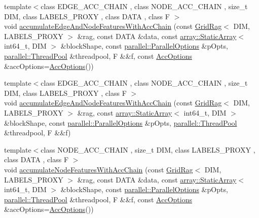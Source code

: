 \begin{DoxyCompactItemize}
\item 
{\footnotesize template$<$class E\+D\+G\+E\+\_\+\+A\+C\+C\+\_\+\+C\+H\+A\+I\+N , class N\+O\+D\+E\+\_\+\+A\+C\+C\+\_\+\+C\+H\+A\+I\+N , size\+\_\+t D\+I\+M, class L\+A\+B\+E\+L\+S\+\_\+\+P\+R\+O\+X\+Y , class D\+A\+T\+A , class F $>$ }\\void \hyperlink{namespacenifty_1_1graph_a8f3282d2d63b3f644bf2176ed21d3082}{accumulate\+Edge\+And\+Node\+Features\+With\+Acc\+Chain} (const \hyperlink{classnifty_1_1graph_1_1GridRag}{Grid\+Rag}$<$ D\+I\+M, L\+A\+B\+E\+L\+S\+\_\+\+P\+R\+O\+X\+Y $>$ \&rag, const D\+A\+T\+A \&data, const \hyperlink{namespacenifty_1_1array_a683f151f19c851754e0c6d55ed16a0c2}{array\+::\+Static\+Array}$<$ int64\+\_\+t, D\+I\+M $>$ \&block\+Shape, const \hyperlink{classnifty_1_1parallel_1_1ParallelOptions}{parallel\+::\+Parallel\+Options} \&p\+Opts, \hyperlink{classnifty_1_1parallel_1_1ThreadPool}{parallel\+::\+Thread\+Pool} \&threadpool, F \&\&f, const \hyperlink{structnifty_1_1graph_1_1AccOptions}{Acc\+Options} \&acc\+Options=\hyperlink{structnifty_1_1graph_1_1AccOptions}{Acc\+Options}())
\item 
{\footnotesize template$<$class E\+D\+G\+E\+\_\+\+A\+C\+C\+\_\+\+C\+H\+A\+I\+N , class N\+O\+D\+E\+\_\+\+A\+C\+C\+\_\+\+C\+H\+A\+I\+N , size\+\_\+t D\+I\+M, class L\+A\+B\+E\+L\+S\+\_\+\+P\+R\+O\+X\+Y , class F $>$ }\\void \hyperlink{namespacenifty_1_1graph_a5e388756ae7e421f92ef5f78494b94d7}{accumulate\+Edge\+And\+Node\+Features\+With\+Acc\+Chain} (const \hyperlink{classnifty_1_1graph_1_1GridRag}{Grid\+Rag}$<$ D\+I\+M, L\+A\+B\+E\+L\+S\+\_\+\+P\+R\+O\+X\+Y $>$ \&rag, const \hyperlink{namespacenifty_1_1array_a683f151f19c851754e0c6d55ed16a0c2}{array\+::\+Static\+Array}$<$ int64\+\_\+t, D\+I\+M $>$ \&block\+Shape, const \hyperlink{classnifty_1_1parallel_1_1ParallelOptions}{parallel\+::\+Parallel\+Options} \&p\+Opts, \hyperlink{classnifty_1_1parallel_1_1ThreadPool}{parallel\+::\+Thread\+Pool} \&threadpool, F \&\&f)
\item 
{\footnotesize template$<$class N\+O\+D\+E\+\_\+\+A\+C\+C\+\_\+\+C\+H\+A\+I\+N , size\+\_\+t D\+I\+M, class L\+A\+B\+E\+L\+S\+\_\+\+P\+R\+O\+X\+Y , class D\+A\+T\+A , class F $>$ }\\void \hyperlink{namespacenifty_1_1graph_a2cfa949da8b5193deb5fb6d898154e23}{accumulate\+Node\+Features\+With\+Acc\+Chain} (const \hyperlink{classnifty_1_1graph_1_1GridRag}{Grid\+Rag}$<$ D\+I\+M, L\+A\+B\+E\+L\+S\+\_\+\+P\+R\+O\+X\+Y $>$ \&rag, const D\+A\+T\+A \&data, const \hyperlink{namespacenifty_1_1array_a683f151f19c851754e0c6d55ed16a0c2}{array\+::\+Static\+Array}$<$ int64\+\_\+t, D\+I\+M $>$ \&block\+Shape, const \hyperlink{classnifty_1_1parallel_1_1ParallelOptions}{parallel\+::\+Parallel\+Options} \&p\+Opts, \hyperlink{classnifty_1_1parallel_1_1ThreadPool}{parallel\+::\+Thread\+Pool} \&threadpool, F \&\&f, const \hyperlink{structnifty_1_1graph_1_1AccOptions}{Acc\+Options} \&acc\+Options=\hyperlink{structnifty_1_1graph_1_1AccOptions}{Acc\+Options}())

\end{DoxyCompactItemize}
